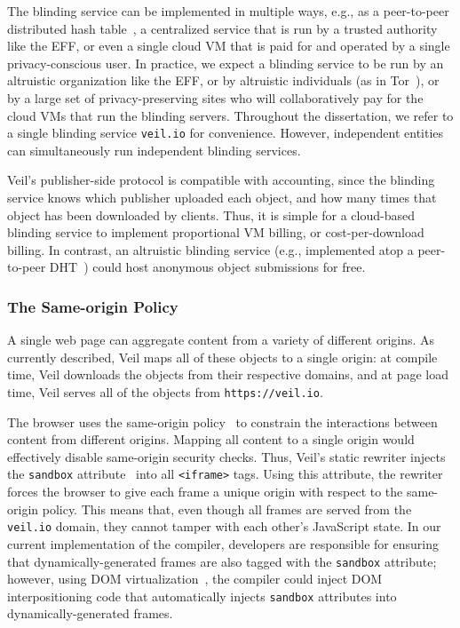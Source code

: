 The blinding service can be implemented
in multiple ways, e.g., as a peer-to-peer
distributed hash table~\cite{pastry,chord},
a centralized service that is run by a
trusted authority like the EFF,
or even a single cloud VM that is paid for and
operated by a single privacy-conscious user. In
practice, we expect a blinding service to be run
by an altruistic organization like the EFF, or by
altruistic individuals (as in Tor~\cite{tor}),
or by a large set of privacy-preserving
sites who will collaboratively pay for the cloud
VMs that run the blinding servers. Throughout the
dissertation, we refer to a single blinding service
\texttt{veil.io} for convenience.
However, independent entities can simultaneously
run independent blinding services.

Veil's publisher-side protocol is compatible
with accounting, since the blinding service knows
which publisher uploaded each object, and how many
times that object has been downloaded by clients.
Thus, it is simple for a cloud-based blinding service
to implement proportional VM billing, or cost-per-download
billing. In contrast, an altruistic blinding service
(e.g., implemented atop a peer-to-peer DHT~\cite{pastry,chord})
could host anonymous object submissions for free.

\subsubsection{The Same-origin Policy}
\label{sec:sop}

A single web page can aggregate content from a
variety of different origins. As currently
described, Veil maps all of these objects to
a single origin: at compile time, Veil downloads
the objects from their respective domains, and
at page load time, Veil serves all of the
objects from \texttt{https://veil.io}.

The browser uses the same-origin policy~\cite{sop}
to constrain the interactions between content
from different origins. Mapping all content to
a single origin would effectively disable
same-origin security checks. Thus, Veil's static
rewriter injects the \texttt{sandbox} attribute~\cite{iframeSandbox}
into all \texttt{<iframe>} tags. Using this
attribute, the rewriter forces the browser
to give each frame a unique origin with respect
to the same-origin policy. This means that,
even though all frames are served from the
\texttt{veil.io} domain, they cannot tamper
with each other's JavaScript state. In our current
implementation of the compiler, developers are
responsible for ensuring that dynamically-generated
frames are also tagged with the \texttt{sandbox}
attribute; however, using DOM virtualization~\cite{treehouse,mugshot},
the compiler could inject DOM interpositioning
code that automatically injects \texttt{sandbox}
attributes into dynamically-generated frames.

